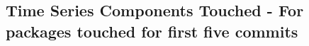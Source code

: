 \subsection{Time Series Components Touched - \label{subsec:codebase_graph_latex.repository_graph.component_time_series.time_series_components_touched_packages_first five commits} 
For packages touched for first five commits} 


\clearpage
